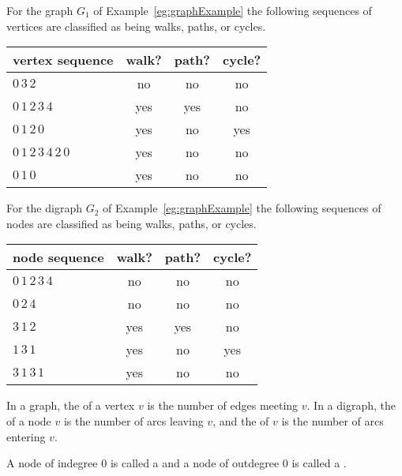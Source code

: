 \begin{Example}
For the graph $G_1$ of Example~\ref{eg:graphExample} the following
sequences of vertices are classified as being walks, paths, or cycles.

\medskip

\begin{center}
\begin{tabular}{|l|c|c|c|}\hline
vertex sequence & walk? & path? &  cycle? \\ \hline
$0\, 3\, 2$ & no & no & no  \\
$0\, 1\, 2\, 3\, 4$ & yes & yes & no \\
$0\, 1\,  2\,  0$ & yes & no & yes  \\
$0\,  1\,  2\,  3\,  4\,  2\,  0$ & yes & no & no \\
$0 \, 1\,  0$ & yes & no & no \\
\hline
\end{tabular}
\end{center}
\end{Example}

\begin{Example}
For the digraph $G_2$ of Example~\ref{eg:graphExample} the following
sequences of nodes are classified as being walks, paths, or cycles.
\medskip

\begin{center}
\begin{tabular}{|l|c|c|c|}\hline
node sequence & walk? & path? & cycle?  \\ \hline
$0\,  1\,  2\,  3\,  4$ & no & no & no  \\
$0\,  2\,  4$ & no & no & no \\
$3\,  1\,  2$ & yes & yes & no \\
$1\,  3\,  1$ & yes & no & yes  \\
$3\,  1\,  3\,  1$ & yes & no & no \\ 
\hline
\end{tabular}
\end{center}
\end{Example}

\begin{Definition} 
In a graph, the  of a vertex $v$ is the number of edges
meeting $v$. In a digraph, the  of a node $v$ is the
number of arcs leaving $v$, and the  of $v$ is the
number of arcs entering $v$.

A node of indegree $0$ is called a  and a node of 
outdegree $0$ is called a .
\end{Definition}

